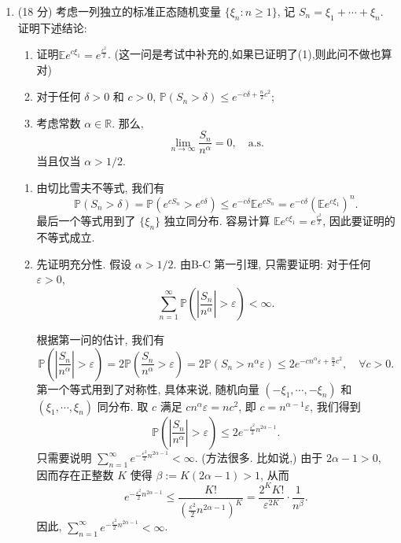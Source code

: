 \begin{enumerate}
\item[五、](18 分)
考虑一列独立的标准正态随机变量 $\{\xi_{n}: n \geq 1\}$, 记 $S_{n}=\xi_{1}+\cdots+\xi_{n}$. 证明下述结论:
\begin{enumerate}[label=(\arabic*)]
\item[(0)] 证明$\mathbb{E} e^{c \xi_{1}}=e^{\frac{c^{2}}{2}}$. (这一问是考试中补充的,如果已证明了(1),则此问不做也算对)
\item 对于任何 $\delta>0$ 和 $c>0$, $\mathbb{P}(S_{n}>\delta) \leq e^{-c \delta+\frac{n}{2} c^{2}}$;
\item 考虑常数 $\alpha \in \mathbb{R}$. 那么,
$$
\lim_{n \to \infty} \frac{S_{n}}{n^{\alpha}}=0, \quad \text{a.s.}
$$
当且仅当 $\alpha>1 / 2$.
\end{enumerate}
\begin{proofc}
    \begin{enumerate}[label=(\arabic*)]
\item 由切比雪夫不等式, 我们有
\[
\mathbb{P}(S_{n}>\delta )=\mathbb{P}(e^{cS_{n}}>e^{c\delta })\leq e^{-c\delta }\mathbb{E}e^{cS_{n}}=e^{-c\delta }\left( \mathbb{E}e^{c\xi _{1}}\right) ^{n}.
\]
最后一个等式用到了 $\{\xi_{n}\}$ 独立同分布. 容易计算 $\mathbb{E} e^{c \xi_{1}}=e^{\frac{c^{2}}{2}}$, 因此要证明的不等式成立.

\item 先证明充分性. 假设 $\alpha>1 / 2$. 由B-C 第一引理, 只需要证明: 对于任何 $\varepsilon>0$,
\[
\sum_{n=1}^{\infty} \mathbb{P}\left(\left|\frac{S_{n}}{n^{\alpha}}\right|>\varepsilon\right)<\infty .
\]

根据第一问的估计, 我们有
\[
\mathbb{P}\left( \left| \frac {S_{n}}{n^{\alpha }}\right | >\varepsilon \right) =2\mathbb{P}\left( \frac {S_{n}}{n^{\alpha }}>\varepsilon \right) =2\mathbb{P}(S_{n}>n^{\alpha }\varepsilon )\leq 2e^{-cn^{\alpha }\varepsilon +\frac {n}{2}c^{2}}, \quad \forall c>0.
\]
第一个等式用到了对称性, 具体来说, 随机向量 $(-\xi_{1}, \cdots,-\xi_{n})$ 和 $(\xi_{1}, \cdots, \xi_{n})$ 同分布. 取 $c$ 满足 $c n^{\alpha} \varepsilon=n c^{2}$, 即 $c=n^{\alpha-1} \varepsilon$, 我们得到
\[
\mathbb{P}\left(\left|\frac{S_{n}}{n^{\alpha}}\right|>\varepsilon\right) \leq 2 e^{-\frac{\varepsilon^{2}}{2} n^{2 \alpha-1}} .
\]
只需要说明 $\sum_{n=1}^{\infty} e^{-\frac{\varepsilon^{2}}{2} n^{2 \alpha-1}}<\infty$. (方法很多. 比如说,) 由于 $2 \alpha-1>0$, 因而存在正整数 $K$ 使得 $\beta:=K(2 \alpha-1)>1$, 从而
\[
e^{-\frac{\varepsilon^{2}}{2} n^{2 \alpha-1}} \leq \frac{K !}{\left(\frac{\varepsilon^{2}}{2} n^{2 \alpha-1}\right)^{K}}=\frac{2^{K} K !}{\varepsilon^{2 K}} \cdot \frac{1}{n^{\beta}} .
\]
因此, $\sum_{n=1}^{\infty} e^{-\frac{\varepsilon^{2}}{2} n^{2 \alpha-1}}<\infty$.


\end{enumerate}
\end{proofc}
\end{enumerate}
